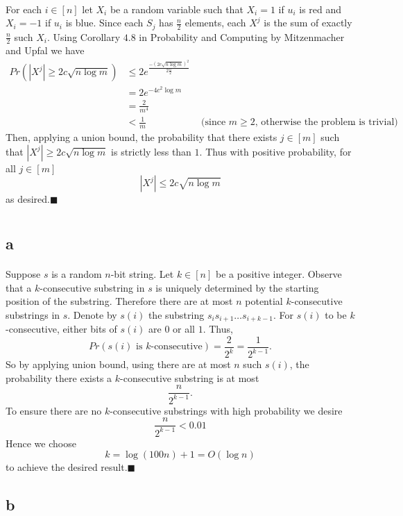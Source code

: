 \documentclass[letterpaper,12pt,oneside,onecolumn]{article}
\begin{document}
\paragraph{}
For each $i \in [n]$ let $X_i$ be a random variable such that $X_i = 1$ if $u_i$ is red and $X_i = -1$ if $u_i$ is  blue. Since each $S_j$ has $\frac{n}{2}$ elements, each $X^j$ is the sum of exactly $\frac{n}{2}$ such $X_i$. Using Corollary $4.8$ in Probability and Computing by Mitzenmacher and Upfal we have
\begin{align*}
Pr(|X^j| \geq 2c\sqrt{n\log m}) &\leq 2e^\frac{-(2c\sqrt{n\log m})^2}{2\frac{n}{2}} \\
&= 2e^{-4c^2\log m}\\
&=\frac{2}{m^4}\\
&< \frac{1}{m} &\text{ (since $m \geq 2$, otherwise the problem is trivial)}.
\end{align*}
Then, applying a union bound,  the probability that there exists $j\in[m]$ such that $|X^j| \geq 2c\sqrt{n\log m}$ is strictly less than $1$. Thus with positive probability, for all $j\in [m]$ $$|X^j| \leq 2c\sqrt{n\log m}$$
as desired.$\blacksquare$
\newpage
\section{}
\subsection{a}
\paragraph{}
Suppose $s$ is a random $n$-bit string. Let $k \in [n]$ be a positive integer. Observe that a $k$-consecutive substring in $s$ is uniquely determined by the starting position of the substring.  Therefore there are at most $n$ potential $k$-consecutive substrings in $s$. Denote by $s(i)$ the substring $s_is_{i+1}\dots s_{i+k-1}$. For $s(i)$ to be $k$-consecutive, either bits of $s(i)$ are $0$ or all $1$. Thus,
$$Pr(s(i) \text{ is $k$-consecutive}) = \frac{2}{2^k} = \frac{1}{2^{k-1}}.$$
So by applying union bound, using there are at most $n$ such $s(i)$, the probability there exists a $k$-consecutive substring is at most
$$\frac{n}{2^{k-1}}.$$
To ensure there are no $k$-consecutive substrings with high probability we desire
$$\frac{n}{2^{k-1}} < 0.01$$
Hence we choose
$$k = \log(100n) +1 = O(\log n)$$
to achieve the desired result.$\blacksquare$
\subsection{b}
\end{document}
